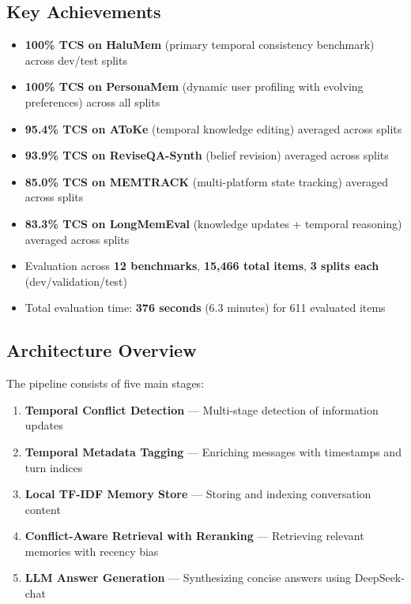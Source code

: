 \documentclass[11pt,a4paper]{article}
\begin{document}
\subsection{Key Achievements}
\begin{itemize}
    \item \textbf{100\% TCS on HaluMem} (primary temporal consistency benchmark) across dev/test splits
    \item \textbf{100\% TCS on PersonaMem} (dynamic user profiling with evolving preferences) across all splits
    \item \textbf{95.4\% TCS on AToKe} (temporal knowledge editing) averaged across splits
    \item \textbf{93.9\% TCS on ReviseQA-Synth} (belief revision) averaged across splits
    \item \textbf{85.0\% TCS on MEMTRACK} (multi-platform state tracking) averaged across splits
    \item \textbf{83.3\% TCS on LongMemEval} (knowledge updates + temporal reasoning) averaged across splits
    \item Evaluation across \textbf{12 benchmarks}, \textbf{15,466 total items}, \textbf{3 splits each} (dev/validation/test)
    \item Total evaluation time: \textbf{376 seconds} (6.3 minutes) for 611 evaluated items
\end{itemize}

\subsection{Architecture Overview}
The pipeline consists of five main stages:
\begin{enumerate}
    \item \textbf{Temporal Conflict Detection} --- Multi-stage detection of information updates
    \item \textbf{Temporal Metadata Tagging} --- Enriching messages with timestamps and turn indices
    \item \textbf{Local TF-IDF Memory Store} --- Storing and indexing conversation content
    \item \textbf{Conflict-Aware Retrieval with Reranking} --- Retrieving relevant memories with recency bias
    \item \textbf{LLM Answer Generation} --- Synthesizing concise answers using DeepSeek-chat
\end{enumerate}

\end{document}
